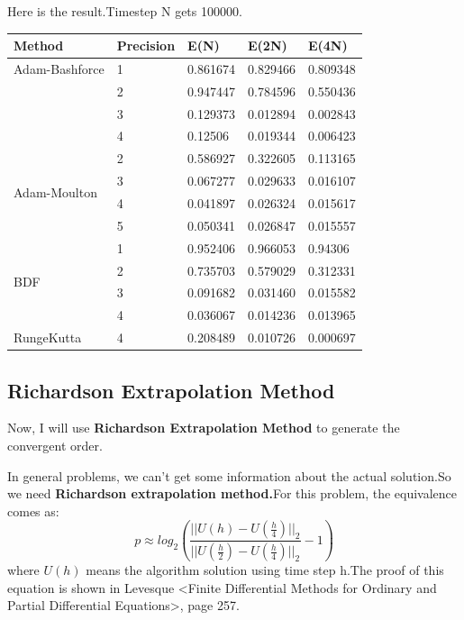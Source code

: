 \documentclass[UTF8]{ctexart}
\theoremstyle{plain}
\theoremstyle{definition}
\theoremstyle{remark}
\begin{document}
Here is the result.Timestep N gets 100000.
\begin{table}[H]
\begin{tabular}{|l|l|l|l|l|}
\hline
Method                        & Precision & E(N)     & E(2N)    & E(4N)    \\ \hline
Adam-Bashforce                & 1         & 0.861674 & 0.829466 & 0.809348 \\ \hline
                              & 2         & 0.947447 & 0.784596 & 0.550436 \\ \hline
                              & 3         & 0.129373 & 0.012894 & 0.002843 \\ \hline
                              & 4         & 0.12506  & 0.019344 & 0.006423 \\ \hline
\multirow{4}{*}{Adam-Moulton} & 2         & 0.586927 & 0.322605 & 0.113165 \\ \cline{2-5} 
                              & 3         & 0.067277 & 0.029633 & 0.016107 \\ \cline{2-5} 
                              & 4         & 0.041897 & 0.026324 & 0.015617 \\ \cline{2-5} 
                              & 5         & 0.050341 & 0.026847 & 0.015557 \\ \hline
\multirow{4}{*}{BDF}          & 1         & 0.952406 & 0.966053 & 0.94306  \\ \cline{2-5} 
                              & 2         & 0.735703 & 0.579029 & 0.312331 \\ \cline{2-5} 
                              & 3         & 0.091682 & 0.031460 & 0.015582 \\ \cline{2-5} 
                              & 4         & 0.036067 & 0.014236 & 0.013965 \\ \hline
RungeKutta                    & 4         & 0.208489 & 0.010726 & 0.000697 \\ \hline
\end{tabular}
\end{table}
\subsection{Richardson Extrapolation Method}
Now, I will use \textbf{Richardson Extrapolation Method} to generate the convergent order.

In general problems, we can't get some information about the actual solution.So we need \textbf{Richardson extrapolation method.}For this problem, the equivalence comes as:
$$
p\approx log_{2}(\frac{||U(h)-U(\frac{h}{4})||_{2}}{||U(\frac{h}{2})-U(\frac{h}{4})||_{2}}-1)
$$
where $U(h)$ means the algorithm solution using time step h.The proof of this equation is shown in Levesque <Finite Differential Methods for Ordinary and Partial Differential Equations>, page 257.
\end{document}
